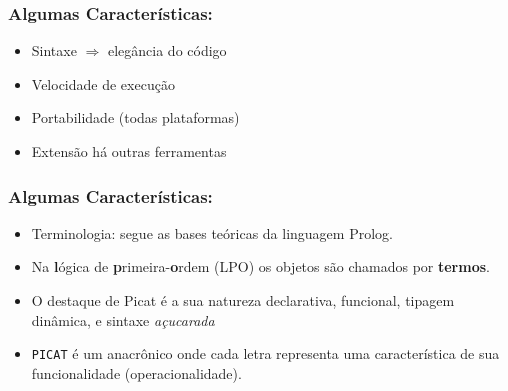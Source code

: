 \documentclass[10pt]{beamer}
\begin{document}
\begin{frame}
    \frametitle{Algumas Características:}

    \begin{itemize}
      \item Sintaxe $\Rightarrow $ elegância do código
      \item Velocidade de execução
      \item Portabilidade (todas plataformas)
      \item Extensão há outras ferramentas
      
    \end{itemize}
\end{frame}


\begin{frame}
    \frametitle{Algumas Características:}
    \begin{itemize}
      \item Terminologia: segue as bases teóricas da linguagem Prolog.
    
      \item Na \textbf{l}ógica de \textbf{p}rimeira-\textbf{o}rdem (LPO) os objetos são chamados por \textbf{termos}.
      
      \item O destaque de Picat é a sua natureza declarativa, funcional, tipagem dinâmica, e sintaxe \textit{açucarada}
      
      \item \texttt{PICAT} é um anacrônico onde cada letra representa uma característica  de sua funcionalidade (operacionalidade).
    
    \end{itemize}
\end{frame}

\end{document}

